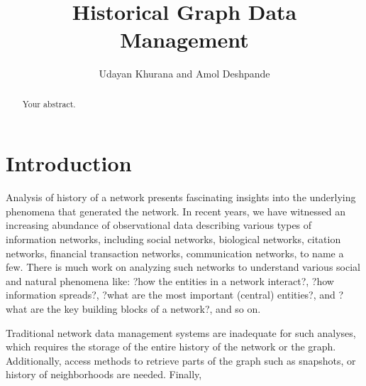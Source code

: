 \documentclass{svjour3}
\begin{document}
\title{Historical Graph Data Management}
\author{Udayan Khurana and Amol Deshpande}
%
%
\maketitle

\begin{abstract}
Your abstract.
\end{abstract}

\section{Introduction}

Analysis of history of a network presents fascinating insights into the underlying phenomena that generated the network. 
In recent years, we have witnessed an increasing abundance of observational data describing
various types of information networks, including social networks, biological networks,
citation networks, financial transaction networks, communication networks, to
name a few. There is much work on analyzing such networks to understand various social
and natural phenomena like: ?how the entities in a network interact?, ?how information
spreads?, ?what are the most important (central) entities?, and ?what are the key building
blocks of a network?, and so on. 

Traditional network data management systems are inadequate for such analyses, which  
requires the storage of the entire history of the network or the graph. Additionally, access methods to retrieve parts of the graph such as snapshots, or history of neighborhoods are needed. Finally, 
\end{document}
